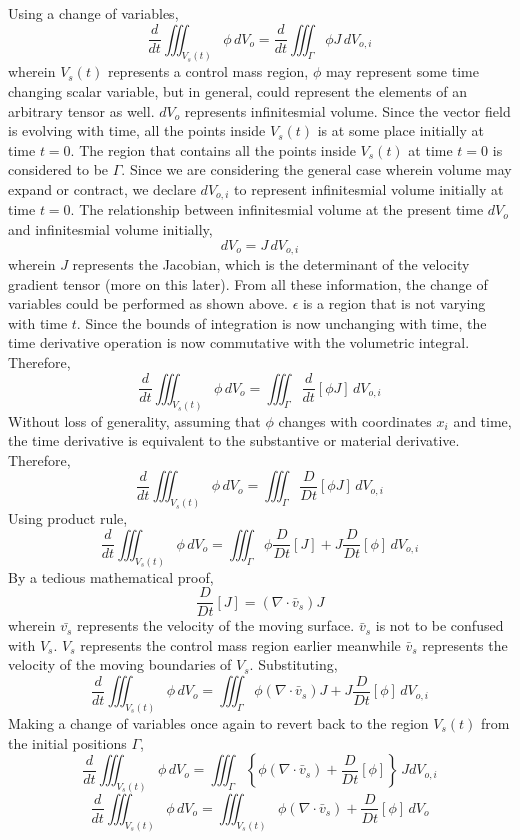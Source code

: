 \documentclass[class=report, 12pt, crop=false]{standalone}
\begin{document}
\begin{center}
Using a change of variables,
$$\frac{d}{dt}\iiint^{}_{V_{s}(t)}\phi \,dV_{o} = \frac{d}{dt}\iiint^{}_{\Gamma} \phi J \,dV_{o,i}$$
wherein $V_{s}(t)$ represents a control mass region, $\phi$ may represent some time changing scalar variable, but in general, could represent the elements of an arbitrary tensor as well. $dV_{o}$ represents infinitesmial volume. Since the vector field is evolving with time, all the points inside $V_{s}(t)$ is at some place initially at time $t = 0$. The region that contains all the points inside $V_{s}(t)$ at time $t = 0$ is considered to be $\Gamma$. Since we are considering the general case wherein volume may expand or contract, we declare $dV_{o,i} $ to represent infinitesmial volume initially at time $t = 0$. The relationship between infinitesmial volume at the present time $dV_{o}$ and infinitesmial volume initially,
$$dV_{o} = J\,dV_{o,i}$$
wherein $J$ represents the Jacobian, which is the determinant of the velocity gradient tensor (more on this later). From all these information, the change of variables could be performed as shown above. $\epsilon$ is a region that is not varying with time $t$. Since the bounds of integration is now unchanging with time, the time derivative operation is now commutative with the volumetric integral. Therefore,
$$\frac{d}{dt}\iiint^{}_{V_{s}(t)}\phi \,dV_{o} = \iiint^{}_{\Gamma}\frac{d}{dt}[\phi J] \,dV_{o,i}$$
Without loss of generality, assuming that $\phi$ changes with coordinates $x_{i}$ and time, the time derivative is equivalent to the substantive or material derivative. Therefore,
$$\frac{d}{dt}\iiint^{}_{V_{s}(t)}\phi \,dV_{o} = \iiint^{}_{\Gamma}\frac{D}{Dt}[\phi J] \,dV_{o,i}$$
Using product rule,
$$\frac{d}{dt}\iiint^{}_{V_{s}(t)}\phi \,dV_{o} = \iiint^{}_{\Gamma}\phi\frac{D}{Dt}[J] + J\frac{D}{Dt}[\phi] \,dV_{o,i}$$
By a tedious mathematical proof,
$$\frac{D}{Dt}[J] = (\nabla \cdot\bar{v}_{s})J$$
wherein $\bar{v_{s}}$ represents the velocity of the moving surface. $\bar{v}_{s}$ is not to be confused with $V_{s}$. $V_{s}$ represents the control mass region earlier meanwhile $\bar{v}_{s}$ represents the velocity of the moving boundaries of $V_{s}$. Substituting,
$$\frac{d}{dt}\iiint^{}_{V_{s}(t)}\phi \,dV_{o} = \iiint^{}_{\Gamma}\phi(\nabla \cdot\bar{v}_{s})J + J\frac{D}{Dt}[\phi] \,dV_{o,i}$$
Making a change of variables once again to revert back to the region $V_{s}(t)$ from the initial positions $\Gamma$,
$$\frac{d}{dt}\iiint^{}_{V_{s}(t)}\phi \,dV_{o} = \iiint^{}_{\Gamma}\left\{\phi(\nabla \cdot\bar{v}_{s}) + \frac{D}{Dt}[\phi]\right\} \,JdV_{o,i}$$
$$\frac{d}{dt}\iiint^{}_{V_{s}(t)}\phi \,dV_{o} = \iiint^{}_{V_{s}(t)} \phi(\nabla \cdot\bar{v}_{s}) + \frac{D}{Dt}[\phi]  \,dV_{o}$$

\end{center}
\end{document}
